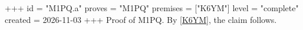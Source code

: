 +++
id = "M1PQ.a"
proves = "M1PQ"
premises = ["K6YM"]
level = "complete"
created = 2026-11-03
+++
Proof of M1PQ. By \ref{K6YM}, the claim follows.
